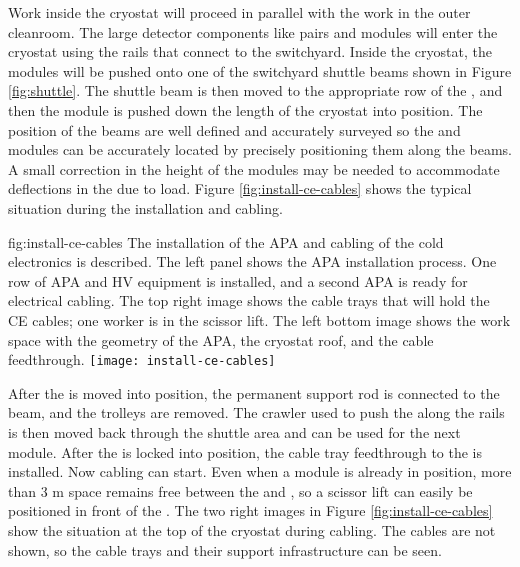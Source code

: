 Work inside the cryostat will proceed in parallel with the work in the outer cleanroom. 
The large detector components like  pairs and  modules will enter the cryostat using the  rails that connect to the  switchyard.
Inside the cryostat, the modules will be pushed onto one of the switchyard shuttle beams shown in  Figure \ref{fig:shuttle}. 
The  shuttle beam is then moved to the appropriate row of the , and then the module is pushed down the length of the cryostat into position. The position of the  beams are well defined and accurately surveyed so the  and  modules can be accurately located by precisely positioning them along the  beams. A small correction in the height of the modules may be needed to accommodate deflections in the  due to load. Figure \ref{fig:install-ce-cables} shows the typical situation during the  installation and  cabling. 

\begin{dunefigure}{fig:install-ce-cables}
  {The installation of the APA and cabling of the cold electronics is described. The left panel shows the APA installation process. One row of APA and HV equipment is installed, and a second APA is ready for electrical cabling. The top right image shows the cable trays that will hold the CE cables; one worker is in the scissor lift. The left bottom image shows the work space with the geometry of the APA, the cryostat roof, and the cable feedthrough.}
\texttt{[image: install-ce-cables]}
\end{dunefigure}

After the  is moved into position, the permanent support rod is connected to the  beam, and the trolleys are removed. 
The crawler used to push the  along the rails is then moved back through the shuttle area and can be used for the next module. 
After the  is locked into position, the cable tray feedthrough to the  is installed. Now  cabling can start. 
Even when a  module is already in position, more than 3 \si{m} space remains free between the  and , so a scissor lift can easily be positioned in front of the . 
The two right images in Figure \ref{fig:install-ce-cables} show the situation at the top of the cryostat during cabling. The cables are not shown, so the cable trays and their support infrastructure can be seen. 

